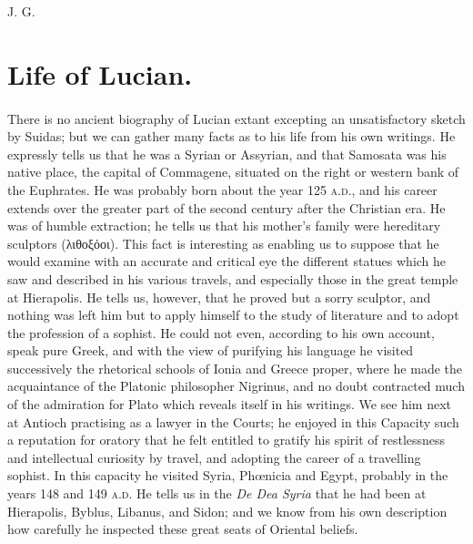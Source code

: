 \documentclass[a4paper, 11pt, oneside, polutonikogreek, english]{article}
\begin{document}
J. G.
\clearpage
\section{Life of Lucian.}
\paragraph{}
There is no ancient biography of Lucian extant excepting an unsatisfactory sketch by Suidas; but we can gather many facts as to his life from his own writings. He expressly tells us that he was a Syrian or Assyrian, and that Samosata was his native place, the capital of Commagene, situated on the right or western bank of the Euphrates. He was probably born about the year 125 \textsc{a.d.}, and his career extends over the greater part of the second century after the Christian era. He was of humble extraction; he tells us that his mother's family were hereditary sculptors (λιθοξόοι). This fact is interesting as enabling us to suppose that he would examine with an accurate and critical eye the different statues which he saw and described in his various travels, and especially those in the great temple at Hierapolis. He tells us, however, that he proved but a sorry sculptor, and nothing was left him but to apply himself to the study of literature and to adopt the profession of a sophist. He could not even, according to his own account, speak pure Greek, and with the view of purifying his language he visited successively the rhetorical schools of Ionia and Greece proper, where he made the acquaintance of the Platonic philosopher Nigrinus, and no doubt contracted much of the admiration for Plato which reveals itself in his writings. We see him next at Antioch practising as a lawyer in the Courts; he enjoyed in this Capacity such a reputation for oratory that he felt entitled to gratify his spirit of restlessness and intellectual curiosity by travel, and adopting the career of a travelling sophist. In this capacity he visited Syria, Phœnicia and Egypt, probably in the years 148 and 149 \textsc{a.d.} He tells us in the \emph{De Dea Syria} that he had been at Hierapolis, Byblus, Libanus, and Sidon; and we know from his own description how carefully he inspected these great seats of Oriental beliefs.
\end{document}
